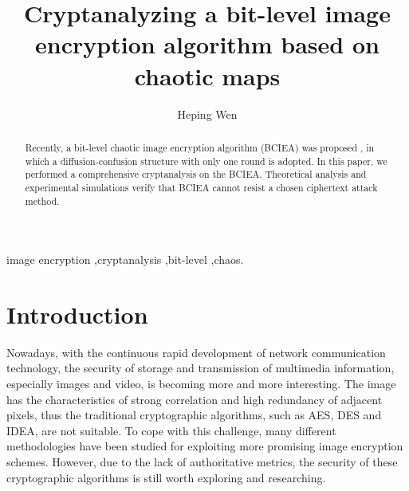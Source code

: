 \documentclass[final,3p,times,twocolumn]{elsarticle}
\begin{document}
\begin{frontmatter}

\title{Cryptanalyzing a bit-level image encryption algorithm based on chaotic maps}

\author[zsi,uestc]{Heping Wen}




\address[zsi]{School of Electronic and Information Engineering, University of Electronic Science and Technology of China, Zhongshan Institute, \\ Zhongshan 528402, China}

\address[uestc]{School of Information and Communication Engineering, University of Electronic Science and Technology of China, Chengdu 611731, China}

\begin{abstract}

Recently, a bit-level chaotic image encryption algorithm (BCIEA) was proposed \cite{LuX2016OLE}, in which a diffusion-confusion structure with only one round is adopted. In this paper, we performed a comprehensive cryptanalysis on the BCIEA. Theoretical analysis and experimental simulations verify that BCIEA cannot resist a chosen ciphertext attack method.


\end{abstract}
\begin{keyword}
image encryption \sep cryptanalysis \sep bit-level \sep chaos.
\end{keyword}
\end{frontmatter}

\section{Introduction}
\label{sec:intro}

Nowadays, with the continuous rapid development of network communication technology, the security of storage and transmission of multimedia information, especially images and video, is becoming more and more interesting.
The image has the characteristics of strong correlation and high redundancy of adjacent pixels, thus the traditional cryptographic algorithms, such as AES, DES and IDEA, are not suitable.
To cope with this challenge, many different methodologies have been studied for exploiting more promising image encryption schemes. 
However, due to the lack of authoritative metrics, the security of these cryptographic algorithms is still worth exploring and researching.
\end{document}
